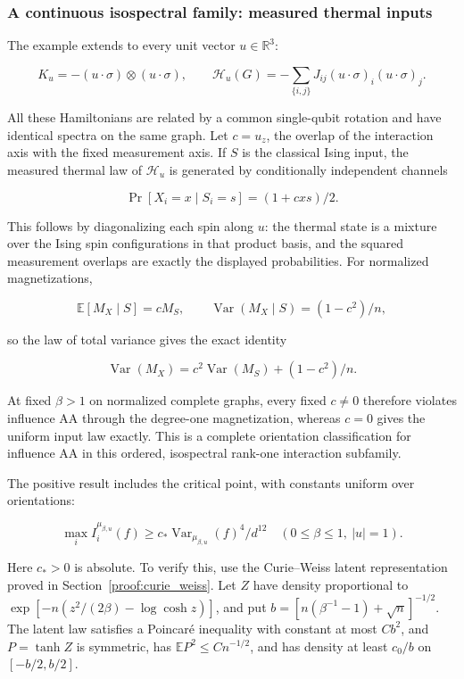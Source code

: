 \subsubsection{A continuous isospectral family: measured thermal
inputs}\label{quant:heading-5}

The example extends to every unit vector \(u\in\mathbb R^3\):

\[
K_u=-(u\cdot\sigma)\otimes(u\cdot\sigma),\qquad
\mathcal H_u(G)=-\sum_{\{i,j\}}J_{ij}(u\cdot\sigma)_i(u\cdot\sigma)_j.
\]

All these Hamiltonians are related by a common single-qubit rotation and
have identical spectra on the same graph. Let \(c=u_z\), the overlap of
the interaction axis with the fixed measurement axis. If \(S\) is the
classical Ising input, the measured thermal law of \(\mathcal H_u\) is
generated by conditionally independent channels

\[
\Pr[X_i=x\mid S_i=s]=(1+cxs)/2.
\]

This follows by diagonalizing each spin along \(u\): the thermal state
is a mixture over the Ising spin configurations in that product basis,
and the squared measurement overlaps are exactly the displayed
probabilities. For normalized magnetizations,

\[
\mathbb E[M_X\mid S]=cM_S,\qquad
\operatorname{Var}(M_X\mid S)=(1-c^2)/n,
\]

so the law of total variance gives the exact identity

\[
\boxed{\operatorname{Var}(M_X)=c^2\operatorname{Var}(M_S)+(1-c^2)/n.}
\]

At fixed \(\beta>1\) on normalized complete graphs, every fixed
\(c\ne0\) therefore violates influence AA through the degree-one
magnetization, whereas \(c=0\) gives the uniform input law exactly. This
is a complete orientation classification for influence AA in this
ordered, isospectral rank-one interaction subfamily.

The positive result includes the critical point, with constants uniform
over orientations:

\[
\boxed{\max_i I_i^{\mu_{\beta,u}}(f)
\ge c_*\operatorname{Var}_{\mu_{\beta,u}}(f)^4/d^{12}
\quad(0\le\beta\le1,\ |u|=1).}
\]

Here \(c_*>0\) is absolute. To verify this, use the Curie--Weiss latent
representation proved in Section~\ref{proof:curie_weiss}. Let
\(Z\) have density proportional to
\(\exp[-n(z^2/(2\beta)-\log\cosh z)]\), and put
\(b=[n(\beta^{-1}-1)+\sqrt n]^{-1/2}\). The latent law satisfies a
Poincaré inequality with constant at most \(Cb^2\), and \(P=\tanh Z\) is
symmetric, has \(\mathbb EP^2\le Cn^{-1/2}\), and has density at least
\(c_0/b\) on \([-b/2,b/2]\).

